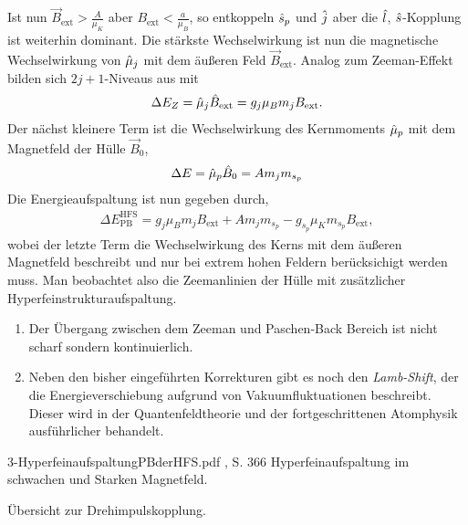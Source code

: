 Ist nun $\vec{B}_\text{ext} > \frac{A}{\mu_K}$ aber $B_\text{ext} <
\frac{a}{\mu_B}$, so entkoppeln $\hat{\boldmath{s}}_p$ und $\hat{\boldmath{j}}$ aber die $\hat{\boldmath{l}}$,
$\hat{\boldmath{s}}$-Kopplung ist weiterhin dominant.
Die stärkste Wechselwirkung ist nun die magnetische Wechselwirkung von
$\hat{\boldmath{\mu}}_j$ mit dem äußeren Feld $\vec{B}_\text{ext}$. Analog zum
Zeeman-Effekt bilden sich $2j+1$-Niveaus aus mit
\begin{align*}
\Delta E_Z = \hat{\boldmath{\mu}}_j \hat{\boldmath{B}}_\text{ext} = g_j \mu_B m_j B_\text{ext}.
\end{align*}
Der nächst kleinere Term ist die Wechselwirkung des Kernmoments
$\hat{\boldmath{\mu}}_{p}$ mit dem Magnetfeld der Hülle $\vec{B}_0$,
\begin{align*}
\Delta E = \hat{\boldmath{\mu}}_{p} \hat{\boldmath{B}}_0 =  A m_j m_{s_p}
\end{align*}
Die Energieaufspaltung ist nun gegeben durch,
\begin{align*}
\Delta E_{\text{PB}}^\text{HFS} = g_j \mu_B m_j B_\text{ext} + A m_j m_{s_p} -
g_{s_p} \mu_K m_{s_p} B_\text{ext},
\end{align*}
wobei der letzte Term die Wechselwirkung des Kerns mit dem äußeren
Magnetfeld beschreibt und nur bei extrem hohen Feldern berücksichigt werden
muss.
Man beobachtet also die Zeemanlinien der Hülle mit zusätzlicher
Hyperfeinstrukturaufspaltung.

\begin{bemn}[Bemerkungen.]
\begin{enumerate}[label=\arabic{*}.)]
  \item Der Übergang zwischen dem Zeeman und Paschen-Back Bereich ist nicht scharf
sondern kontinuierlich.
  \item Neben den bisher eingeführten Korrekturen gibt es noch den 
  \emph{Lamb-Shift}, der die Energieverschiebung aufgrund von 
  Vakuumfluktuationen beschreibt. Dieser wird in der Quantenfeldtheorie und
 der fortgeschrittenen Atomphysik ausführlicher behandelt.\maphere
\end{enumerate}
\end{bemn}

\sfigure%
	{3-HyperfeinaufspaltungPBderHFS.pdf}
	{\HertelSchulz, S. 366}
	{Hyperfeinaufspaltung im schwachen und Starken Magnetfeld.}

	{}
	{Übersicht zur Drehimpulskopplung.}

